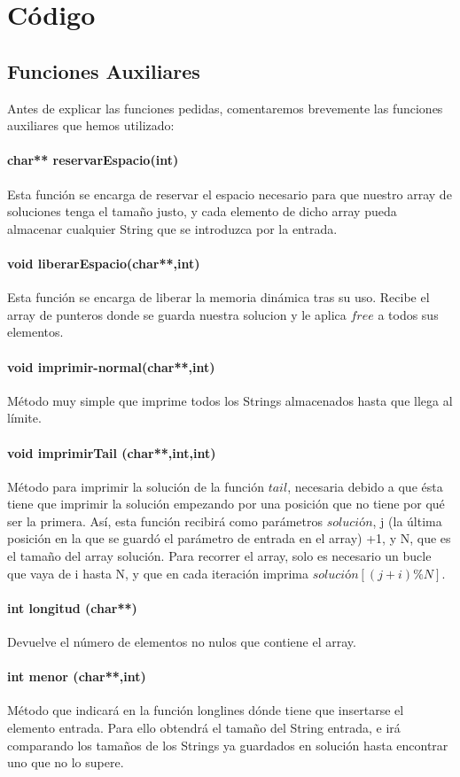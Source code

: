 \chapter{Código}
\section{Funciones Auxiliares}
Antes de explicar las funciones pedidas, comentaremos brevemente las funciones auxiliares que hemos utilizado: 
\subsubsection{char** reservarEspacio(int)}
Esta función se encarga de reservar el espacio necesario para que nuestro array de soluciones tenga el tamaño justo, y cada elemento de dicho array pueda almacenar cualquier String que se introduzca por la entrada.
\subsubsection{void liberarEspacio(char**,int)}
Esta función se encarga de liberar la memoria dinámica tras su uso. Recibe el array de punteros donde se guarda nuestra solucion y le aplica $free$ a todos sus elementos.
\subsubsection{void imprimir-normal(char**,int)}
Método muy simple que imprime todos los Strings almacenados hasta que llega al límite.
\subsubsection{void imprimirTail (char**,int,int)}
Método para imprimir la solución de la función $tail$, necesaria debido a que ésta tiene que imprimir la solución empezando por una posición que no tiene por qué ser la primera.
Así, esta función recibirá como parámetros $solución$, j (la última posición en la que se guardó el parámetro de entrada en el array) +1, y N, que es el tamaño del array solución. Para recorrer el array, solo es necesario un bucle que vaya de i hasta N, y que en cada iteración imprima $solución[(j+i)\%N]$.
\subsubsection{int longitud (char**)}
Devuelve el número de elementos no nulos que contiene el array.
\subsubsection{int menor (char**,int)}
Método que indicará en la función longlines dónde tiene que insertarse el elemento entrada. Para ello obtendrá el tamaño del String entrada, e irá comparando los tamaños de los Strings ya guardados en solución hasta encontrar uno que no lo supere.
